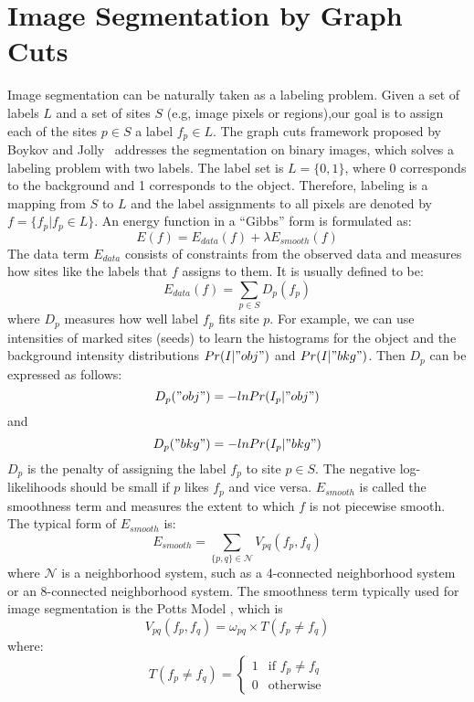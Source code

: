 \section{Image Segmentation by Graph Cuts}\label{sec:2}
Image segmentation can be naturally taken as a labeling problem. Given a set of labels $L$ and a set of sites $S$ (e.g, image pixels or regions),our goal is to assign each of the sites $p\in S$ a label $f_p\in L$. The graph cuts framework proposed by Boykov and Jolly~\cite{Yuri01} addresses the segmentation on binary images, which solves a labeling problem with two labels. The label set is $L=\{0,1\}$, where 0 corresponds to the background and 1 corresponds to the object. Therefore, labeling is a mapping from $S$ to $L$ and the label assignments to all pixels are denoted by $f=\{f_p|f_p\in L\}$. An energy function in a ``Gibbs'' form is formulated as:
 \begin{equation}
      E(f) = E_{data}(f)+\lambda E_{smooth}(f) \label{IGC:equ:energy1}
    \end{equation}
The data term $E_{data}$ consists of constraints from the observed
data and measures how sites like the labels that $f$ assigns to
them. It is usually defined to be:
   \begin{equation}
     E_{data}(f) = \sum_{p\in S}D_p(f_p)
   \end{equation}
   where $D_p$ measures how well label $f_p$ fits site $p$. For
    example, we can use intensities of marked sites (seeds) to learn the
    histograms for the object and the background intensity distributions
    $Pr(I|"obj")$ and $Pr(I|"bkg")$. Then $D_p$ can be expressed as
    follows:
    \begin{equation}
    D_{p}("obj")=-ln Pr(I_p|"obj")
    \end{equation}
    and
    \begin{equation}
    D_{p}("bkg")=-ln Pr(I_p|"bkg")
    \end{equation}
    $D_p$ is the penalty of assigning the label $f_p$ to site $p\in
    S$. The negative log-likelihoods should be small if $p$ likes $f_p$ and vice versa.
    $E_{smooth}$ is called the smoothness term and measures the
    extent to which $f$ is not piecewise smooth. The typical form of
    $E_{smooth}$ is:
    \begin{equation}
    E_{smooth}=\sum_{\{p,q\}\in \mathcal{N}}V_{pq}(f_p,f_q)
    \end{equation}
    where $\mathcal{N}$ is a neighborhood system,
    such as a 4-connected neighborhood system or an 8-connected neighborhood system. The
    smoothness term typically used for image segmentation is the Potts Model \cite{Yuri98},
    which is
    \begin{equation}
    V_{pq}(f_p,f_q)=\omega_{pq} \times T(f_p \neq f_q)\label{IGC:equ:smoothness}
    \end{equation}
    where:
    \[
        T(f_p \neq f_q) = \left\{
        \begin{array}{ll}
        1 &\mbox{if $f_p \neq f_q$}\\
        0 &\mbox{otherwise}
        \end{array}
        \right.
    \]

